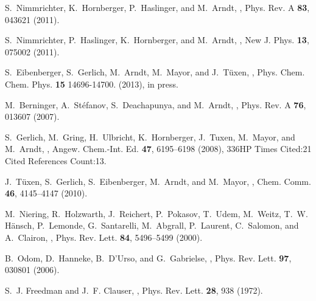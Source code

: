 \documentclass[12pt]{article}
\begin{document}
\begin{thebibliography}{100}
S.~Nimmrichter, K.~Hornberger, P.~Haslinger, and M.~Arndt,
,
\newblock Phys. Rev. A {\bf 83}, 043621 (2011).

S.~Nimmrichter, P.~Haslinger, K.~Hornberger, and M.~Arndt,
,
\newblock New J. Phys. {\bf 13}, 075002 (2011).

S.~Eibenberger, S.~Gerlich, M.~Arndt, M.~Mayor, and J.~Tüxen,
,
\newblock Phys. Chem. Chem. Phys. {\bf 15} 14696-14700. (2013),
\newblock in press.

M.~Berninger, A.~Stéfanov, S.~Deachapunya, and M.~Arndt,
,
\newblock Phys. Rev. A {\bf 76}, 013607 (2007).

S.~Gerlich, M.~Gring, H.~Ulbricht, K.~Hornberger, J.~Tuxen, M.~Mayor, and
  M.~Arndt,
,
\newblock Angew. Chem.-Int. Ed. {\bf 47}, 6195--6198 (2008),
\newblock 336HP Times Cited:21 Cited References Count:13.

J.~Tüxen, S.~Gerlich, S.~Eibenberger, M.~Arndt, and M.~Mayor,
,
\newblock Chem. Comm. {\bf 46}, 4145--4147 (2010).

M.~Niering, R.~Holzwarth, J.~Reichert, P.~Pokasov, T.~Udem, M.~Weitz, T.~W.
  H\"ansch, P.~Lemonde, G.~Santarelli, M.~Abgrall, P.~Laurent, C.~Salomon, and
  A.~Clairon,
,
\newblock Phys. Rev. Lett. {\bf 84}, 5496--5499 (2000).

B.~Odom, D.~Hanneke, B.~D'Urso, and G.~Gabrielse,
,
\newblock Phys. Rev. Lett. {\bf 97}, 030801 (2006).

S.~J. Freedman and J.~F. Clauser,
,
\newblock Phys. Rev. Lett. {\bf 28}, 938 (1972).


\end{thebibliography}
\end{document}
